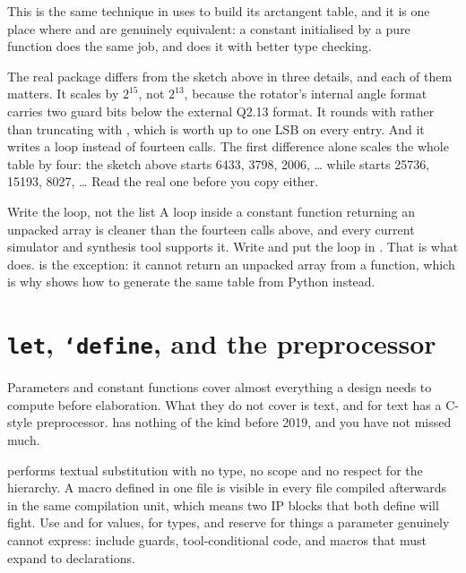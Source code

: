 This is the same technique  in  uses to build
its arctangent table, and it is one place where \SV{} and \VHDL{} are genuinely
equivalent: a \VHDL{} constant initialised by a pure function does the same job,
and does it with better type checking.

The real package differs from the sketch above in three details, and each of
them matters. It scales by $2^{15}$, not $2^{13}$, because the rotator's
internal angle format  carries two guard bits below the
external Q2.13 format. It rounds with  rather than
truncating with , which is worth up to one LSB on every entry.
And it writes a  loop instead of fourteen calls. The first difference
alone scales the whole table by four: the sketch above starts 6433, 3798,
2006, \dots{} while  starts 25736, 15193, 8027, \dots{} Read
the real one before you copy either.

\begin{tipbox}{Write the loop, not the list}
A  loop inside a constant function returning an unpacked array is
cleaner than the fourteen calls above, and every current simulator and
synthesis tool supports it. Write  and put the loop in . That is what
 does.  is the exception: it cannot
return an unpacked array from a function, which is why  shows
how to generate the same table from Python instead.
\end{tipbox}

\section{\texttt{let}, \texttt{`define}, and the preprocessor}
\label{sec:beyond:macro}

Parameters and constant functions cover almost everything a design needs to
compute before elaboration. What they do not cover is text, and for text
\SV{} has a C-style preprocessor. \VHDL{} has nothing of the kind before 2019,
and you have not missed much.

 performs textual substitution with no type, no scope and no
respect for the hierarchy. A macro defined in one file is visible in every
file compiled afterwards in the same compilation unit, which means two IP
blocks that both define  will fight. Use  and
 for values,  for types, and reserve
 for things a parameter genuinely cannot express: include
guards, tool-conditional code, and macros that must expand to declarations.

